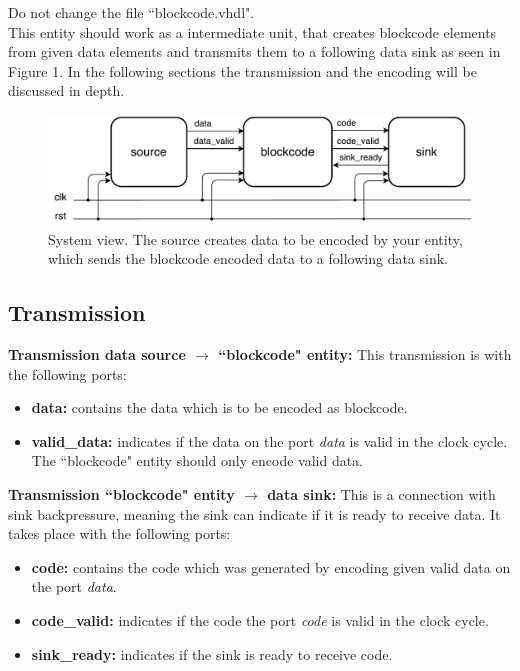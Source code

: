 \documentclass[a4paper,12pt]{article}
\begin{document}
Do not change the file ``blockcode.vhdl".\\

This entity should work as a intermediate unit, that creates blockcode elements from given data elements and transmits 
them to a following data sink as seen in Figure 1. In the following sections the transmission and the encoding will 
be discussed in depth.
\\

\begin{figure}[h!]
\centering
\includegraphics[scale=0.6]{../static/system_view.pdf} 
\caption{System view. The source creates data to be encoded by your entity, which sends the blockcode encoded data to
a following data sink.}
\end{figure}

\newpage
\subsection*{\noindent Transmission}

\textbf{Transmission data source $\rightarrow$ ``blockcode" entity:} This transmission is with the following ports:
\begin{itemize} 
\item \textbf{data:} contains the data which is to be encoded as blockcode.
\item \textbf{valid\_data:} indicates if the data on the port \textit{data} is valid in the clock cycle.
The ``blockcode" entity should only encode valid data.
\end{itemize}

\textbf{Transmission ``blockcode" entity $\rightarrow$ data sink:} This is a connection with sink backpressure, 
meaning the sink can indicate if it is ready to receive data. It takes place with the following ports:
\begin{itemize} 
\item \textbf{code:} contains the code which was generated by encoding given valid data on the port \textit{data}. 
\item \textbf{code\_valid:} indicates if the code the port \textit{code} is valid in the clock cycle.
\item \textbf{sink\_ready:} indicates if the sink is ready to receive code. 
\end{itemize}
\end{document}
